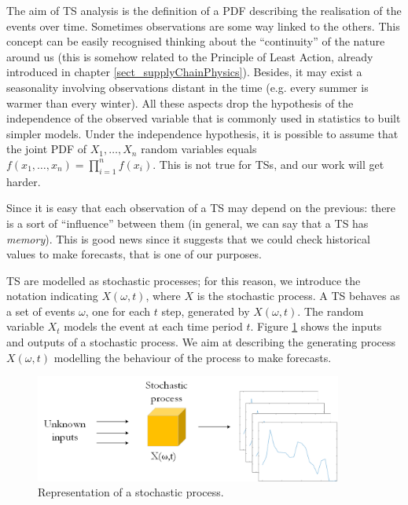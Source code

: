 The aim of TS analysis is the definition of a PDF describing the realisation of the events over time. Sometimes observations are some way linked to the others. This concept can be easily recognised thinking about the “continuity” of the nature around us (this is somehow related to the Principle of Least Action, already introduced in chapter \ref{sect_supplyChainPhysics}). Besides, it may exist a seasonality involving observations distant in the time (e.g. every summer is warmer than every winter). All these aspects drop the hypothesis of the independence of the observed variable that is commonly used in statistics to built simpler models. Under the independence hypothesis, it is possible to assume that the joint PDF of $X_1,\ldots,X_n$ random variables equals $f(x_1,\ldots,x_n)=\prod_{i=1}^{n}{f(x_i)}$. This is not true for TSs, and our work will get harder.\par

Since it is easy that each observation of a TS may depend on the previous: there is a sort of “influence” between them (in general, we can say that a TS has \textit{memory}). This is good news since it suggests that we could check historical values to make forecasts, that is one of our purposes.\par

TS are modelled as stochastic processes; for this reason, we introduce the notation indicating $X(\omega,t)$, where $X$ is the stochastic process. A TS behaves as a set of events $\omega$, one for each $t$ step, generated by $X(\omega,t)$. The random variable $X_t$ models the event at each time period $t$. Figure \ref{fig_stochProcess} shows the inputs and outputs of a stochastic process. We aim at describing the generating process $X(\omega,t)$ modelling the behaviour of the process to make forecasts.

\begin{figure}[hbt!]
\centering
\includegraphics[width=0.9\textwidth]{SectionLetsMath/elemStat_figures/fig_stochProcess.png}
\captionsetup{type=figure}
\caption{Representation of a stochastic process.}
\label{fig_stochProcess}
\end{figure}


